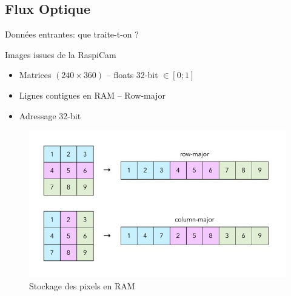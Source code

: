 \documentclass{bredelebeamer}
\begin{document}

	\subsection{Flux Optique}



\begin{frame}{Données entrantes: que traite-t-on ?}


\begin{block}{Images issues de la RaspiCam}
\begin{itemize}
	\item Matrices $(240\times 360)$ -- floats 32-bit $\in \left[0;1\right]$
	\item Lignes contigues en RAM -- Row-major
	\item Adressage 32-bit
\end{itemize}
\end{block}

\begin{figure}
\centering
\includegraphics[scale=0.2]{images/rowcolumnarrays.jpg}
\caption{Stockage des pixels en RAM}
\end{figure}


\end{frame}

\end{document}

